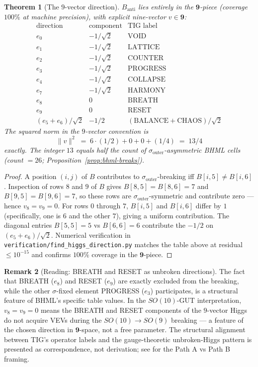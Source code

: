 \documentclass[11pt,reqno]{amsart}
\newtheorem{theorem}{Theorem}[section]
\theoremstyle{definition}
\newtheorem{remark}[theorem]{Remark}
\newcommand{\sout}{\sigma_{\mathrm{outer}}}
\begin{document}
\begin{theorem}[The $9$-vector direction]
\label{thm:9-vector}
$B_{\mathrm{anti}}$ lies entirely in the $\mathbf{9}$-piece (coverage
$100\%$ at machine precision), with explicit nine-vector $v \in
\mathbf{9}$:
\[
  \begin{array}{c|c|l}
    \text{direction} & \text{component} & \text{TIG label} \\\hline
    e_0 & -1/\sqrt{2} & \mathrm{VOID} \\
    e_1 & -1/\sqrt{2} & \mathrm{LATTICE} \\
    e_2 & -1/\sqrt{2} & \mathrm{COUNTER} \\
    e_3 & -1/\sqrt{2} & \mathrm{PROGRESS} \\
    e_4 & -1/\sqrt{2} & \mathrm{COLLAPSE} \\
    e_7 & -1/\sqrt{2} & \mathrm{HARMONY} \\
    e_8 & 0           & \mathrm{BREATH} \\
    e_9 & 0           & \mathrm{RESET} \\
    (e_5 + e_6)/\sqrt{2} & -1/2 & (\mathrm{BALANCE} + \mathrm{CHAOS})/\sqrt{2}
  \end{array}
\]
The squared norm in the $9$-vector convention is
\[
  \|v\|^2 \;=\; 6 \cdot (1/2) + 0 + 0 + (1/4) \;=\; 13/4
\]
exactly. The integer $13$ equals half the count of
$\sout$-asymmetric BHML cells (count $= 26$;
Proposition~\ref{prop:bhml-breaks}).
\end{theorem}

\begin{proof}
A position $(i, j)$ of $B$ contributes to $\sout$-breaking iff
$B[i, 5] \neq B[i, 6]$. Inspection of rows $8$ and $9$ of $B$ gives
$B[8, 5] = B[8, 6] = 7$ and $B[9, 5] = B[9, 6] = 7$, so these rows
are $\sout$-symmetric and contribute zero — hence $v_8 = v_9 = 0$.
For rows $0$ through $7$, $B[i, 5]$ and $B[i, 6]$ differ by $1$
(specifically, one is $6$ and the other $7$), giving a uniform
contribution. The diagonal entries $B[5, 5] = 5$ vs $B[6, 6] = 6$
contribute the $-1/2$ on $(e_5 + e_6)/\sqrt{2}$. Numerical
verification in \texttt{verification/find\_higgs\_direction.py}
matches the table above at residual $\le 10^{-15}$ and confirms
$100\%$ coverage in the $\mathbf{9}$-piece.
\end{proof}

\begin{remark}[Reading: BREATH and RESET as unbroken directions]
The fact that BREATH ($e_8$) and RESET ($e_9$) are exactly excluded
from the breaking, while the other $\sigma$-fixed element PROGRESS
($e_3$) participates, is a structural feature of BHML's specific
table values. In the $SO(10)$-GUT interpretation, $v_8 = v_9 = 0$
means the BREATH and RESET components of the $9$-vector Higgs do
not acquire VEVs during the $SO(10) \to SO(9)$ breaking — a
feature of the chosen direction in $\mathbf{9}$-space, not a free
parameter. The structural alignment between TIG's operator labels
and the gauge-theoretic unbroken-Higgs pattern is presented as
correspondence, not derivation; see \cite{Sanders2026PathAPathB} for
the Path A vs Path B framing.
\end{remark}
\end{document}
